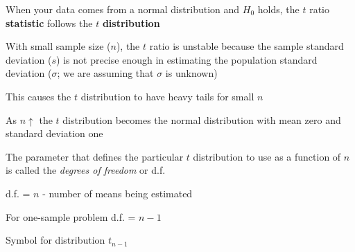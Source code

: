 \item When your data comes from a normal distribution and $H_{0}$ holds, the
  $t$ ratio \textbf{statistic} follows the $t$ \textbf{distribution}
\item With small sample size ($n$), the $t$ ratio is unstable because the sample standard deviation ($s$) is not
  precise enough in estimating the population standard deviation ($\sigma$; we are assuming that $\sigma$
  is unknown)
\item This causes the $t$ distribution to have heavy tails for small
  $n$
\item As $n\uparrow$ the $t$ distribution becomes the normal
  distribution with mean zero and standard deviation one
\item The parameter that defines the particular $t$ distribution to
  use as a function of $n$ is called the \emph{degrees of freedom} or
  d.f.
\item d.f. = $n$ - number of means being estimated
\item For one-sample problem d.f. = $n-1$
\item Symbol for distribution $t_{n-1}$

